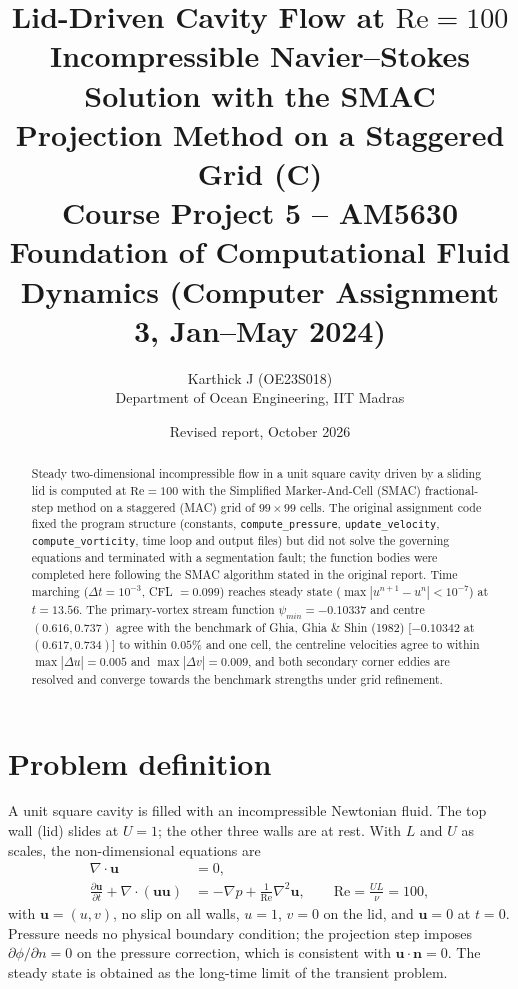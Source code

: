 
\title{\textbf{Lid-Driven Cavity Flow at $\mathrm{Re}=100$}\\[2pt]\large Incompressible Navier--Stokes Solution with the SMAC Projection Method on a Staggered Grid (C)\\[2pt]\normalsize Course Project 5 -- AM5630 Foundation of Computational Fluid Dynamics (Computer Assignment 3, Jan--May 2024)}
\author{Karthick J (OE23S018)\\Department of Ocean Engineering, IIT Madras}
\date{Revised report, October 2026}
\maketitle
\begin{abstract}
Steady two-dimensional incompressible flow in a unit square cavity driven by a sliding lid is computed at $\mathrm{Re}=100$ with the Simplified Marker-And-Cell (SMAC) fractional-step method on a staggered (MAC) grid of $99\times99$ cells. The original assignment code fixed the program structure (constants, \texttt{compute\_pressure}, \texttt{update\_velocity}, \texttt{compute\_vorticity}, time loop and output files) but did not solve the governing equations and terminated with a segmentation fault; the function bodies were completed here following the SMAC algorithm stated in the original report. Time marching ($\Delta t=10^{-3}$, CFL $=0.099$) reaches steady state ($\max|u^{n+1}-u^n|<10^{-7}$) at $t=13.56$. The primary-vortex stream function $\psi_{min}=-0.10337$ and centre $(0.616,0.737)$ agree with the benchmark of Ghia, Ghia \& Shin (1982) [$-0.10342$ at $(0.617,0.734)$] to within $0.05\%$ and one cell, the centreline velocities agree to within $\max|\Delta u|=0.005$ and $\max|\Delta v|=0.009$, and both secondary corner eddies are resolved and converge towards the benchmark strengths under grid refinement.
\end{abstract}
\tableofcontents\newpage

\section{Problem definition}
A unit square cavity is filled with an incompressible Newtonian fluid. The top wall (lid) slides at $U=1$; the other three walls are at rest. With $L$ and $U$ as scales, the non-dimensional equations are
\begin{align}
\nabla\cdot\mathbf{u}&=0, \label{eq:cont}\\
\frac{\partial\mathbf{u}}{\partial t}+\nabla\cdot(\mathbf{u}\mathbf{u})&=-\nabla p+\frac{1}{\mathrm{Re}}\nabla^2\mathbf{u},\qquad \mathrm{Re}=\frac{UL}{\nu}=100, \label{eq:mom}
\end{align}
with $\mathbf{u}=(u,v)$, no slip on all walls, $u=1$, $v=0$ on the lid, and $\mathbf{u}=0$ at $t=0$. Pressure needs no physical boundary condition; the projection step imposes $\partial\phi/\partial n=0$ on the pressure correction, which is consistent with $\mathbf{u}\cdot\mathbf{n}=0$. The steady state is obtained as the long-time limit of the transient problem.

